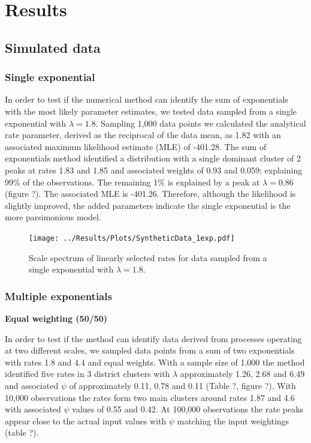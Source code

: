\documentclass[11pt,usenames,dvipsnames,a4paper]{article}
\begin{document}
\section{Results}

\noindent
\subsection{Simulated data}

\subsubsection{Single exponential}

\begin{linenumbers}
\hspace{\parindent}
In order to test if the numerical method can identify the sum of exponentials with the most likely parameter estimates, we tested data sampled from a single exponential with $\lambda = 1.8$. Sampling 1,000 data points we calculated the analytical rate parameter, derived as the reciprocal of the data mean, as 1.82 with an associated maximum likelihood estimate (MLE) of -401.28. The sum of exponentials method identified a distribution with a single dominant cluster of 2 peaks at rates 1.83 and 1.85 and associated weights of 0.93 and 0.059; explaining 99\% of the observations. The remaining 1\% is explained by a peak at $\lambda = 0.86$ (figure ?). The associated MLE is -401.26. Therefore, although the likelihood is slightly improved, the added parameters indicate the single exponential is the more parsimonious model.
\end{linenumbers}
\begin{figure}[H]
	\centering
	\texttt{[image: ../Results/Plots/SyntheticData\_1exp.pdf]}
	\caption{Scale spectrum of linearly selected rates for data sampled from a single exponential with $\lambda = 1.8$.}
\end{figure}


\subsubsection{Multiple exponentials}

\noindent
\textbf{Equal weighting (50/50)}
\begin{linenumbers}
	
In order to test if the method can identify data derived from processes operating at two different scales, we sampled data points from a sum of two exponentials with rates 1.8 and 4.4 and equal weights. With a sample size of 1,000 the method identified five rates in 3 district clusters with $\lambda$ approximately 1.26, 2.68 and 6.49 and associated $\psi$ of approximately 0.11, 0.78 and 0.11 (Table ?, figure ?). With 10,000 observations the rates form two main clusters around rates 1.87 and 4.6 with associated $\psi$ values of 0.55 and 0.42. At 100,000 observations the rate peaks appear close to the actual input values with $\psi$ matching the input weightings (table ?).
\end{linenumbers}
\end{document}
